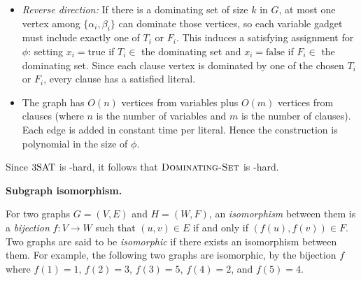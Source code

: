 \documentclass[11pt,addpoints,answers]{exam}
\begin{document}
\begin{questions}
\begin{parts}
\begin{solution}
\begin{itemize}
        \item \emph{Reverse direction:} If there is a dominating set of size \(k\) in \(G\), at most one vertex among \(\{\alpha_i,\beta_i\}\) can dominate those vertices, so each variable gadget must include exactly one of \(T_i\) or \(F_i\). This induces a satisfying assignment for \(\phi\): setting \(x_i=\text{true}\) if \(T_i\in\) the dominating set and \(x_i=\text{false}\) if \(F_i\in\) the dominating set. Since each clause vertex is dominated by one of the chosen \(T_i\) or \(F_i\), every clause has a satisfied literal.
        
        \item The graph has \(O(n)\) vertices from variables plus \(O(m)\) vertices from clauses (where \(n\) is the number of variables and \(m\) is the number of clauses). Each edge is added in constant time per literal. Hence the construction is polynomial in the size of \(\phi\).
        \end{itemize}
        Since \(\text{3SAT}\) is \NP-hard, it follows that \(\textsc{Dominating-Set}\) is \NP-hard.
        \end{solution}
  \end{parts}
  \pagebreak

  \question \textbf{Subgraph isomorphism.} \label{subgraphiso}
  
For two graphs $G = (V,E)$ and $H = (W, F)$, an \emph{isomorphism} between them is a \emph{bijection} $f:V \to W$ such that $(u,v) \in E$ if and only if $(f(u), f(v)) \in F$. Two graphs are said to be \emph{isomorphic} if there exists an isomorphism between them. For example, the following two graphs are isomorphic, by the bijection $f$ where $f(1) = 1$, $f(2) = 3$, $f(3) = 5$, $f(4) = 2$, and $f(5) = 4$. 

\begin{figure}[H]
    \centering
    \begin{minipage}{0.45\textwidth}
        \centering
    \end{minipage}
    \begin{minipage}{0.45\textwidth}
        \centering
\end{minipage}
\end{figure}
\end{questions}
\end{document}
